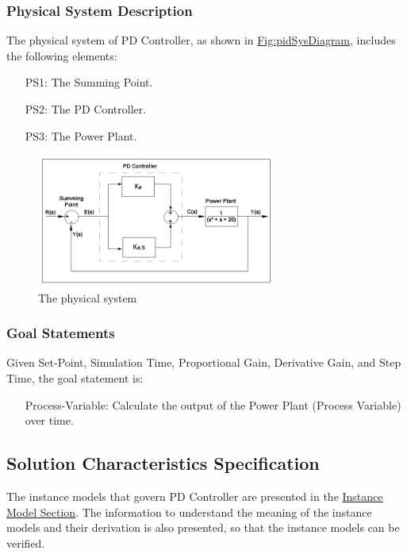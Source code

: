 \documentclass[12pt]{article}
\begin{document}
\subsubsection{Physical System Description}
\label{Sec:PhysSyst}
The physical system of PD Controller, as shown in \hyperref[Figure:pidSysDiagram]{Fig:pidSysDiagram}, includes the following elements:

\begin{itemize}
\item[PS1:]{The Summing Point.}
\item[PS2:]{The PD Controller.}
\item[PS3:]{The Power Plant.}
\end{itemize}
\begin{figure}[H]
\begin{center}
\includegraphics[width=0.7\textwidth]{../../../../datafiles/pdcontroller/Fig_PDController.png}
\caption{The physical system}
\label{Figure:pidSysDiagram}
\end{center}
\end{figure}
\subsubsection{Goal Statements}
\label{Sec:GoalStmt}
Given Set-Point, Simulation Time, Proportional Gain, Derivative Gain, and Step Time, the goal statement is:

\begin{itemize}
\item[Process-Variable:\phantomsection\label{processVariable}]{Calculate the output of the Power Plant (Process Variable) over time.}
\end{itemize}
\subsection{Solution Characteristics Specification}
\label{Sec:SolCharSpec}
The instance models that govern PD Controller are presented in the \hyperref[Sec:IMs]{Instance Model Section}. The information to understand the meaning of the instance models and their derivation is also presented, so that the instance models can be verified.
\end{document}
